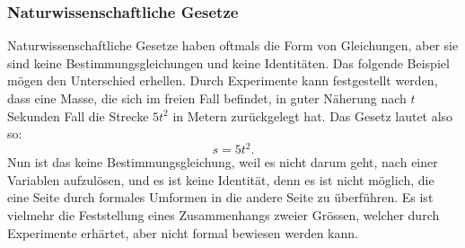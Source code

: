\documentclass[11pt,oneside]{article}
\begin{document}
	\subsubsection*{Naturwissenschaftliche Gesetze}
		Naturwissenschaftliche Gesetze haben oftmals die Form von Gleichungen, aber sie sind keine Bestimmungsgleichungen und keine Identitäten. Das folgende Beispiel mögen den Unterschied erhellen.\newline
		Durch Experimente kann festgestellt werden, dass eine Masse, die sich im freien Fall befindet, in guter Näherung nach $t$ Sekunden Fall die Strecke  $5t^2$ in Metern zurückgelegt hat. Das Gesetz lautet also so: \[s=5t^2.\] Nun ist das keine Bestimmungsgleichung, weil es nicht darum geht, nach einer Variablen aufzulösen, und es ist keine Identität, denn es ist nicht möglich, die eine Seite durch formales Umformen in die andere Seite zu überführen. Es ist vielmehr die Feststellung eines Zusammenhangs zweier Grössen, welcher durch Experimente erhärtet, aber nicht formal bewiesen werden kann.
\end{document}
